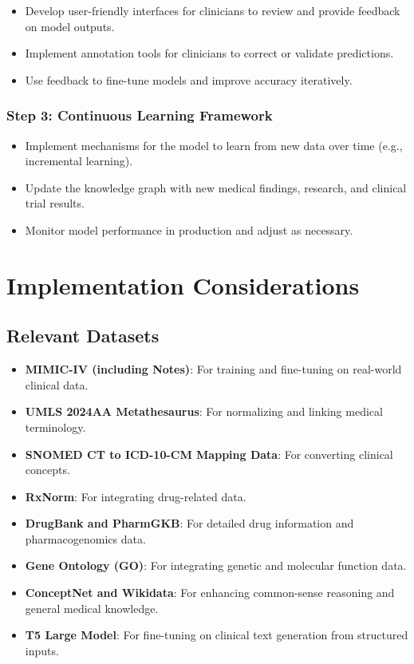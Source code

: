 \documentclass[12pt, a4paper]{article}
\begin{document}
\begin{itemize}
    \item Develop user-friendly interfaces for clinicians to review and provide feedback on model outputs.
    \item Implement annotation tools for clinicians to correct or validate predictions.
    \item Use feedback to fine-tune models and improve accuracy iteratively.
\end{itemize}

\subsubsection{Step 3: Continuous Learning Framework}

\begin{itemize}
    \item Implement mechanisms for the model to learn from new data over time (e.g., incremental learning).
    \item Update the knowledge graph with new medical findings, research, and clinical trial results.
    \item Monitor model performance in production and adjust as necessary.
\end{itemize}

\section{Implementation Considerations}

\subsection{Relevant Datasets}

\begin{itemize}
    \item \textbf{MIMIC-IV (including Notes)}: For training and fine-tuning on real-world clinical data.
    \item \textbf{UMLS 2024AA Metathesaurus}: For normalizing and linking medical terminology.
    \item \textbf{SNOMED CT to ICD-10-CM Mapping Data}: For converting clinical concepts.
    \item \textbf{RxNorm}: For integrating drug-related data.
    \item \textbf{DrugBank and PharmGKB}: For detailed drug information and pharmacogenomics data.
    \item \textbf{Gene Ontology (GO)}: For integrating genetic and molecular function data.
    \item \textbf{ConceptNet and Wikidata}: For enhancing common-sense reasoning and general medical knowledge.
    \item \textbf{T5 Large Model}: For fine-tuning on clinical text generation from structured inputs.
\end{itemize}
\end{document}

